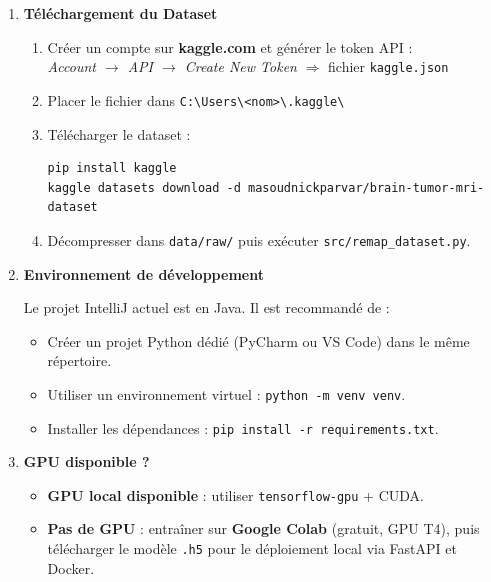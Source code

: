 \documentclass[12pt,a4paper]{article}
\begin{document}
\begin{enumerate}[label=\textbf{\arabic*.}, leftmargin=1.5cm, itemsep=0.5cm]

  \item \textbf{Téléchargement du Dataset}

  \begin{enumerate}[label=\alph*)]
    \item Créer un compte sur \textbf{kaggle.com} et générer le token API :\\
    \textit{Account $\rightarrow$ API $\rightarrow$ Create New Token} $\Rightarrow$ fichier \texttt{kaggle.json}
    \item Placer le fichier dans \texttt{C:\textbackslash Users\textbackslash <nom>\textbackslash .kaggle\textbackslash}
    \item Télécharger le dataset :
    \begin{verbatim}
pip install kaggle
kaggle datasets download -d masoudnickparvar/brain-tumor-mri-dataset
    \end{verbatim}
    \item Décompresser dans \texttt{data/raw/} puis exécuter \texttt{src/remap\_dataset.py}.
  \end{enumerate}

  \item \textbf{Environnement de développement}

  Le projet IntelliJ actuel est en Java. Il est recommandé de :
  \begin{itemize}
    \item Créer un projet Python dédié (PyCharm ou VS Code) dans le même répertoire.
    \item Utiliser un environnement virtuel : \texttt{python -m venv venv}.
    \item Installer les dépendances : \texttt{pip install -r requirements.txt}.
  \end{itemize}

  \item \textbf{GPU disponible ?}

  \begin{itemize}
    \item \textbf{GPU local disponible} : utiliser \texttt{tensorflow-gpu} + CUDA.
    \item \textbf{Pas de GPU} : entraîner sur \textbf{Google Colab} (gratuit, GPU T4), puis télécharger le modèle \texttt{.h5} pour le déploiement local via FastAPI et Docker.
  \end{itemize}

\end{enumerate}
\end{document}
